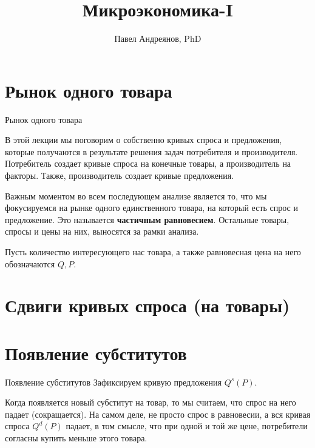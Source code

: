 \documentclass{beamer}
\title{
Микроэкономика-I
}
\author{
Павел Андреянов, PhD
}
\begin{document}
\maketitle

\section{Рынок одного товара}

\begin{frame}{Рынок одного товара}
	
В этой лекции мы поговорим о собственно кривых спроса и предложения, которые получаются в результате решения задач потребителя и производителя. Потребитель создает кривые спроса на конечные товары, а производитель на факторы. Также, производитель создает кривые предложения.

Важным моментом во всем последующем анализе является то, что мы фокусируемся на рынке одного единственного товара, на который есть спрос и предложение. Это называется \textbf{частичным равновесием}. Остальные товары, спросы и цены на них, выносятся за рамки анализа.

Пусть количество интересующего нас товара, а также равновесная цена на него обозначаются $Q,P$.
	
\end{frame}

\section{Сдвиги кривых спроса (на товары)}

\section{Появление субститутов}

\begin{frame}{Появление субститутов}
Зафиксируем кривую предложения $Q^s(P)$.

Когда появляется новый субститут на товар, то мы считаем, что спрос на него падает (сокращается). На самом деле, не просто спрос в равновесии, а вся кривая спроса $Q^d(P)$ падает, в том смысле, что при одной и той же цене, потребители согласны купить меньше этого товара.

\end{frame}
\end{document}
